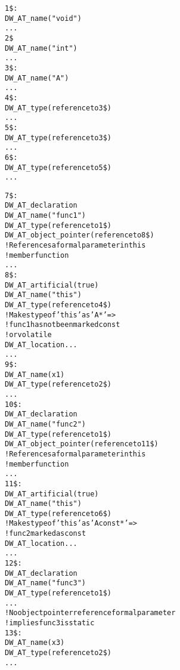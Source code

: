 \begin{alltt}
1\$: 
        DW\-\_AT\-\_name("void")
                ...
2\$ 
        DW\-\_AT\-\_name("int")
        ...
3\$: 
        DW\-\_AT\-\_name("A")
        ...
4\$:    
            DW\-\_AT\-\_type(reference to 3\$)
            ...
5\$:    
            DW\-\_AT\-\_type(reference to 3\$)
            ...
6\$:    
            DW\-\_AT\-\_type(reference to 5\$)
            ...

7\$:    
            DW\-\_AT\-\_declaration
            DW\-\_AT\-\_name("func1")
            DW\-\_AT\-\_type(reference to 1\$)
            DW\-\_AT\-\_object\-\_pointer(reference to 8\$)
                ! References a formal parameter in this 
                ! member function
            ...
8\$:        
                DW\-\_AT\-\_artificial(true)
                DW\-\_AT\-\_name("this")
                DW\-\_AT\-\_type(reference to 4\$)
                    ! Makes type of 'this' as 'A*' =>
                    ! func1 has not been marked const 
                    ! or volatile
                DW\-\_AT\-\_location ...
                ...
9\$:        
                DW\-\_AT\-\_name(x1)
                DW\-\_AT\-\_type(reference to 2\$)
                ...
10\$:    
             DW\-\_AT\-\_declaration
             DW\-\_AT\-\_name("func2")
             DW\-\_AT\-\_type(reference to 1\$)
             DW\-\_AT\-\_object\-\_pointer(reference to 11\$)
             ! References a formal parameter in this 
             ! member function
             ...
11\$:        
                 DW\-\_AT\-\_artificial(true)
                 DW\-\_AT\-\_name("this")
                 DW\-\_AT\-\_type(reference to 6\$)
                     ! Makes type of 'this' as 'A const*' =>
                 !     func2 marked as const
                 DW\-\_AT\-\_location ...
                 ...
12\$:    
             DW\-\_AT\-\_declaration
             DW\-\_AT\-\_name("func3")
             DW\-\_AT\-\_type(reference to 1\$)
             ...
                 ! No object pointer reference formal parameter
                 ! implies func3 is static
13\$:        
                 DW\-\_AT\-\_name(x3)
                 DW\-\_AT\-\_type(reference to 2\$)
                 ...
\end{alltt}

